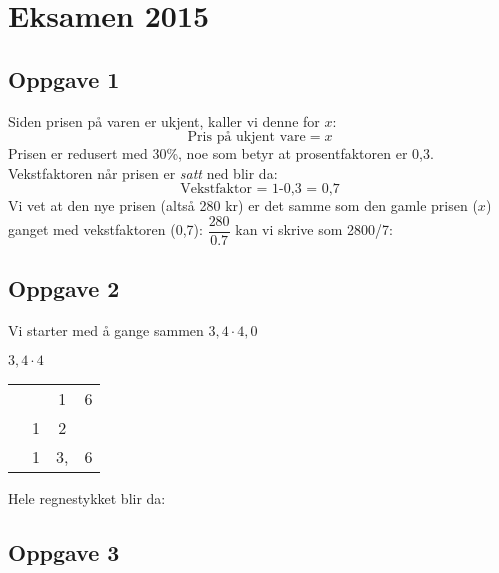 %
%



\section{Eksamen 2015}
\subsection{Oppgave 1}
Siden prisen på varen er ukjent, kaller vi denne for $ x $:
\[ \text{Pris på ukjent vare}=x \]
Prisen er redusert med 30\%, noe som betyr at prosentfaktoren er 0,3. Vekstfaktoren når prisen er \textit{satt} ned blir da:
\[ \text{Vekstfaktor = 1-0,3 = 0,7} \]
Vi vet at den nye prisen (altså 280 kr) er det samme som den gamle prisen ($ x $) ganget med vekstfaktoren (0,7):
$ \dfrac{280}{0.7} $ kan vi skrive som 2800/7:
\subsection{Oppgave 2}
Vi starter med å gange sammen $ 3,4\cdot4,0 $ \vspace{-11 pt}
\begin{center}
	$ 3,4 \cdot4 $ \\
	\begin{tabular}{c@{\,}c@{\,}c@{\,}c}
		\hline
		&  & 1 & 6 \\
		 & 1  & 2 &  \\
		\hline
		& 1 & 3, & 6 \\
	\end{tabular}
\end{center}
Hele regnestykket blir da:

\subsection{Oppgave 3}

